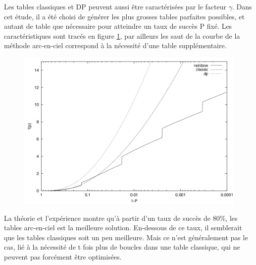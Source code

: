 	Les tables classiques et DP peuvent aussi être caractérisées par le facteur $\gamma$. Dans cet étude, il a été choisi de générer les plus grosses tables parfaites possibles, et autant de table que nécessaire pour atteindre un taux de succès P fixé. Les caractéristiques sont tracés en figure \ref{fig:TMTO_carac}, par ailleurs les saut de la courbe de la méthode arc-en-ciel correspond à la nécessité d'une table supplémentaire.
\begin{figure}[h]
	\includegraphics[scale=0.25]{other/graph_gamma_P.png}
	\label{fig:TMTO_carac}
\end{figure}
	La théorie et l'expérience montre qu'à partir d'un taux de succès de 80\%, les tables arc-en-ciel est la meilleure solution. En-dessous de ce taux, il semblerait que les tables classiques soit un peu meilleure. Mais ce n'est généralement pas le cas, lié à la nécessité de t fois plus de boucles dans une table classique, qui ne peuvent pas forcément être optimisées.



\endinput{}

